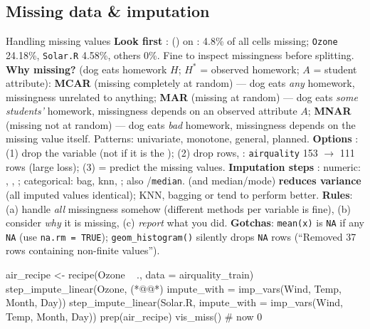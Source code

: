 \subsection{Missing data \& imputation}
\begin{topic}{Handling missing values}
\textbf{Look first} :  () on : 4.8\% of all cells missing; \texttt{Ozone} 24.18\%, \texttt{Solar.R} 4.58\%, others 0\%. Fine to inspect missingness before splitting.
\textbf{Why missing?}  (dog eats homework $H$; $H^*$ = observed homework; $A$ = student attribute):
\textbf{MCAR} (missing completely at random) --- dog eats \emph{any} homework, missingness unrelated to anything;
\textbf{MAR} (missing at random) --- dog eats \emph{some students'} homework, missingness depends on an observed attribute $A$;
\textbf{MNAR} (missing not at random) --- dog eats \emph{bad} homework, missingness depends on the missing value itself.
Patterns: univariate, monotone, general, planned.
\textbf{Options} : (1) drop the variable (not if it is the ); (2) drop rows, : \texttt{airquality} 153 $\to$ 111 rows (large loss); (3)  = predict the missing values.
\textbf{Imputation steps} : numeric: , , ; categorical: bag, knn, ; also /\texttt{median}.  (and median/mode) \textbf{reduces variance} (all imputed values identical); KNN, bagging or  tend to perform better.
\textbf{Rules}: (a) handle \emph{all} missingness somehow (different methods per variable is fine), (b) consider \emph{why} it is missing, (c) \emph{report} what you did.
\textbf{Gotchas}: \texttt{mean(x)} is \texttt{NA} if any \texttt{NA} (use \texttt{na.rm = TRUE}); \texttt{geom\_histogram()} silently drops \texttt{NA} rows (``Removed 37 rows containing non-finite values'').
\end{topic}
\begin{rcode}
air_recipe <- recipe(Ozone ~ ., data = airquality_train) %
  step_impute_linear(Ozone,                       (*@@*)
       impute_with = imp_vars(Wind, Temp, Month, Day)) %
  step_impute_linear(Solar.R,
       impute_with = imp_vars(Wind, Temp, Month, Day))
prep(air_recipe) %
  vis_miss()                     # now 0%
\end{rcode}

